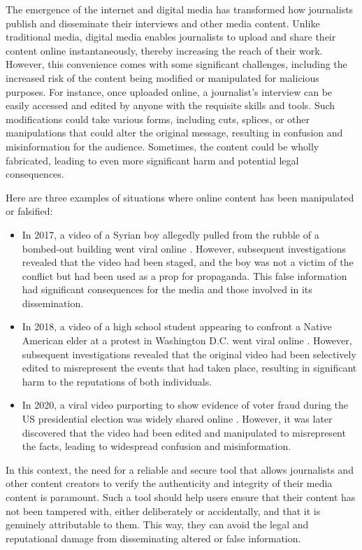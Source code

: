 \documentclass[target=mst,aauheader=]{thud}
\begin{document}
The emergence of the internet and digital media has transformed how journalists publish and disseminate their interviews and other media content. Unlike traditional media, digital media enables journalists to upload and share their content online instantaneously, thereby increasing the reach of their work. However, this convenience comes with some significant challenges, including the increased risk of the content being modified or manipulated for malicious purposes. For instance, once uploaded online, a journalist's interview can be easily accessed and edited by anyone with the requisite skills and tools. Such modifications could take various forms, including cuts, splices, or other manipulations that could alter the original message, resulting in confusion and misinformation for the audience. Sometimes, the content could be wholly fabricated, leading to even more significant harm and potential legal consequences.\par
Here are three examples of situations where online content has been manipulated or falsified:

\begin{itemize}

    \item In 2017, a video of a Syrian boy allegedly pulled from the rubble of a bombed-out building went viral online \cite{2017FakeVideo}. However, subsequent investigations revealed that the video had been staged, and the boy was not a victim of the conflict but had been used as a prop for propaganda. This false information had significant consequences for the media and those involved in its dissemination.
    \item In 2018, a video of a high school student appearing to confront a Native American elder at a protest in Washington D.C. went viral online \cite{2018fakeVideo}. However, subsequent investigations revealed that the original video had been selectively edited to misrepresent the events that had taken place, resulting in significant harm to the reputations of both individuals.
    \item In 2020, a viral video purporting to show evidence of voter fraud during the US presidential election was widely shared online \cite{2020fakeVideo}. However, it was later discovered that the video had been edited and manipulated to misrepresent the facts, leading to widespread confusion and misinformation.

\end{itemize}

In this context, the need for a reliable and secure tool that allows journalists and other content creators to verify the authenticity and integrity of their media content is paramount. Such a tool should help users ensure that their content has not been tampered with, either deliberately or accidentally, and that it is genuinely attributable to them. This way, they can avoid the legal and reputational damage from disseminating altered or false information.
\end{document}
